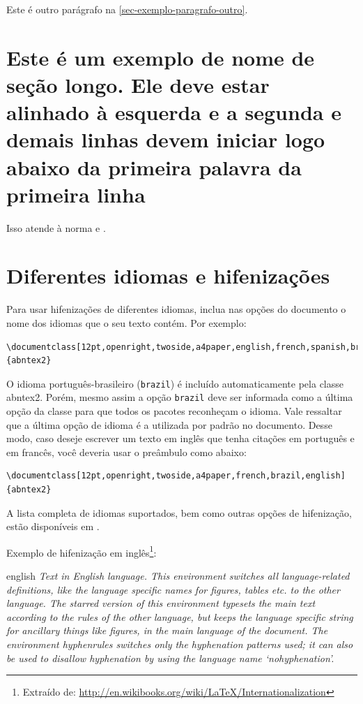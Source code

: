 Este é outro parágrafo na \autoref{sec-exemplo-paragrafo-outro}. 



\section{Este é um exemplo de nome de seção longo. Ele deve estar
alinhado à esquerda e a segunda e demais linhas devem iniciar logo abaixo da
primeira palavra da primeira linha}

Isso atende à norma  
 e .

\section{Diferentes idiomas e hifenizações}
\label{sec-hifenizacao}

Para usar hifenizações de diferentes idiomas, inclua nas opções do documento o
nome dos idiomas que o seu texto contém. Por exemplo:

\begin{verbatim}
\documentclass[12pt,openright,twoside,a4paper,english,french,spanish,brazil]{abntex2}
\end{verbatim}

O idioma português-brasileiro (\texttt{brazil}) é incluído automaticamente pela
classe \textsf{abntex2}. Porém, mesmo assim a opção \texttt{brazil} deve ser
informada como a última opção da classe para que todos os pacotes reconheçam o
idioma. Vale ressaltar que a última opção de idioma é a utilizada por padrão no
documento. Desse modo, caso deseje escrever um texto em inglês que tenha
citações em português e em francês, você deveria usar o preâmbulo como abaixo:

\begin{verbatim}
\documentclass[12pt,openright,twoside,a4paper,french,brazil,english]{abntex2}
\end{verbatim}

A lista completa de idiomas suportados, bem como outras opções de hifenização,
estão disponíveis em .

Exemplo de hifenização em inglês\footnote{Extraído de:
\url{http://en.wikibooks.org/wiki/LaTeX/Internationalization}}:

\begin{otherlanguage*}{english}
\textit{Text in English language. This environment switches all language-related
definitions, like the language specific names for figures, tables etc. to the other
language. The starred version of this environment typesets the main text
according to the rules of the other language, but keeps the language specific
string for ancillary things like figures, in the main language of the document.
The environment hyphenrules switches only the hyphenation patterns used; it can
also be used to disallow hyphenation by using the language name
`nohyphenation'.}
\end{otherlanguage*}

